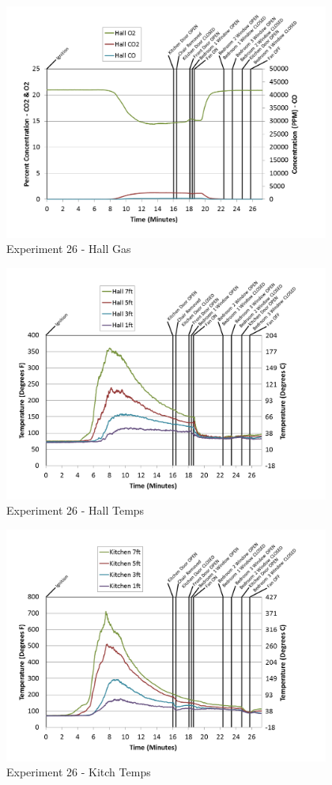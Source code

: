 \documentclass{article}
\begin{document}
\begin{appendices}
\begin{figure}[h!]
	\centering
	\includegraphics[height=3.05in]{0_Images/Results_Charts/Exp_26_Charts/HallGas.png}
	\caption{Experiment 26 - Hall Gas}
\end{figure}

\clearpage

\begin{figure}[h!]
	\centering
	\includegraphics[height=3.05in]{0_Images/Results_Charts/Exp_26_Charts/HallTemps.png}
	\caption{Experiment 26 - Hall Temps}
\end{figure}


\begin{figure}[h!]
	\centering
	\includegraphics[height=3.05in]{0_Images/Results_Charts/Exp_26_Charts/KitchTemps.png}
	\caption{Experiment 26 - Kitch Temps}
\end{figure}


\end{appendices}
\end{document}
